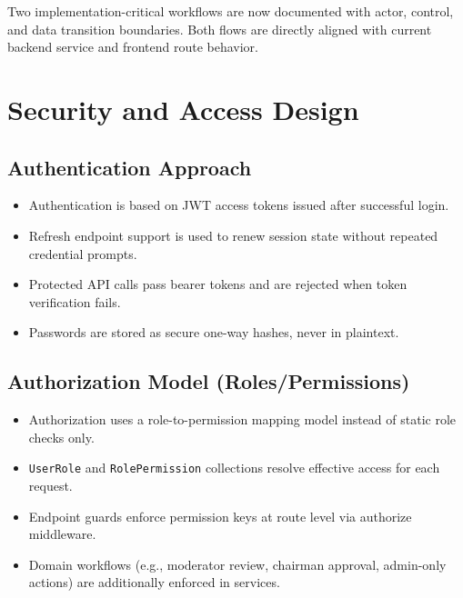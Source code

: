 \documentclass[12pt,a4paper]{article}
\begin{document}
\begin{tcolorbox}[summarybox]
Two implementation-critical workflows are now documented with actor, control, and data transition boundaries. Both flows are directly aligned with current backend service and frontend route behavior.
\end{tcolorbox}

\section{Security and Access Design}

\subsection{Authentication Approach}

\begin{itemize}[noitemsep]
  \item Authentication is based on JWT access tokens issued after successful login.
  \item Refresh endpoint support is used to renew session state without repeated credential prompts.
  \item Protected API calls pass bearer tokens and are rejected when token verification fails.
  \item Passwords are stored as secure one-way hashes, never in plaintext.
\end{itemize}

\subsection{Authorization Model (Roles/Permissions)}

\begin{itemize}[noitemsep]
  \item Authorization uses a role-to-permission mapping model instead of static role checks only.
  \item \texttt{UserRole} and \texttt{RolePermission} collections resolve effective access for each request.
  \item Endpoint guards enforce permission keys at route level via authorize middleware.
  \item Domain workflows (e.g., moderator review, chairman approval, admin-only actions) are additionally enforced in services.
\end{itemize}
\end{document}
